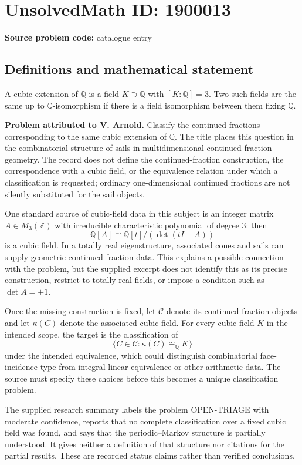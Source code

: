 \documentclass[11pt]{article}
\newcommand{\Z}{\mathbb{Z}}
\newcommand{\Q}{\mathbb{Q}}
\begin{document}
\section*{UnsolvedMath ID: 1900013}
\textbf{Source problem code:} catalogue entry
\subsection{Definitions and mathematical statement}
A cubic extension of $\Q$ is a field $K\supset\Q$ with $[K:\Q]=3$. Two such fields are the same up to $\Q$-isomorphism if there is a field isomorphism between them fixing $\Q$.

\textbf{Problem attributed to V. Arnold.} Classify the continued fractions corresponding to the same cubic extension of $\Q$. The title places this question in the combinatorial structure of sails in multidimensional continued-fraction geometry. The record does not define the continued-fraction construction, the correspondence with a cubic field, or the equivalence relation under which a classification is requested; ordinary one-dimensional continued fractions are not silently substituted for the sail objects.

One standard source of cubic-field data in this subject is an integer matrix $A\in M_3(\Z)$ with irreducible characteristic polynomial of degree $3$: then
\[
 \Q[A]\cong\Q[t]/(\det(tI-A))
\]
is a cubic field. In a totally real eigenstructure, associated cones and sails can supply geometric continued-fraction data. This explains a possible connection with the problem, but the supplied excerpt does not identify this as its precise construction, restrict to totally real fields, or impose a condition such as $\det A=\pm1$.

Once the missing construction is fixed, let $\mathcal C$ denote its continued-fraction objects and let $\kappa(C)$ denote the associated cubic field. For every cubic field $K$ in the intended scope, the target is the classification of
\[
 \{C\in\mathcal C:\kappa(C)\cong_{\Q}K\}
\]
under the intended equivalence, which could distinguish combinatorial face-incidence type from integral-linear equivalence or other arithmetic data. The source must specify these choices before this becomes a unique classification problem.

The supplied research summary labels the problem OPEN-TRIAGE with moderate confidence, reports that no complete classification over a fixed cubic field was found, and says that the periodic--Markov structure is partially understood. It gives neither a definition of that structure nor citations for the partial results. These are recorded status claims rather than verified conclusions.
\end{document}
